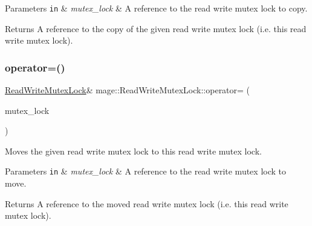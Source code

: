 \begin{DoxyParams}[1]{Parameters}
\mbox{\tt in}  & {\em mutex\+\_\+lock} & A reference to the read write mutex lock to copy. \\
\hline
\end{DoxyParams}
\begin{DoxyReturn}{Returns}
A reference to the copy of the given read write mutex lock (i.\+e. this read write mutex lock). 
\end{DoxyReturn}
\hypertarget{structmage_1_1_read_write_mutex_lock_a0c31334330a9259b0b68d71b9ee13704}{}\label{structmage_1_1_read_write_mutex_lock_a0c31334330a9259b0b68d71b9ee13704} 
\subsubsection{\texorpdfstring{operator=()}{operator=()}\hspace{0.1cm}{\footnotesize\ttfamily [2/2]}}
{\footnotesize\ttfamily \hyperlink{structmage_1_1_read_write_mutex_lock}{Read\+Write\+Mutex\+Lock}\& mage\+::\+Read\+Write\+Mutex\+Lock\+::operator= (\begin{DoxyParamCaption}\item[{\hyperlink{structmage_1_1_read_write_mutex_lock}{Read\+Write\+Mutex\+Lock} \&\&}]{mutex\+\_\+lock }\end{DoxyParamCaption})\hspace{0.3cm}{\ttfamily [delete]}}

Moves the given read write mutex lock to this read write mutex lock.


\begin{DoxyParams}[1]{Parameters}
\mbox{\tt in}  & {\em mutex\+\_\+lock} & A reference to the read write mutex lock to move. \\
\hline
\end{DoxyParams}
\begin{DoxyReturn}{Returns}
A reference to the moved read write mutex lock (i.\+e. this read write mutex lock). 
\end{DoxyReturn}
\hypertarget{structmage_1_1_read_write_mutex_lock_a25629916d6a73e930763c34aaa13c647}{}\label{structmage_1_1_read_write_mutex_lock_a25629916d6a73e930763c34aaa13c647} 
